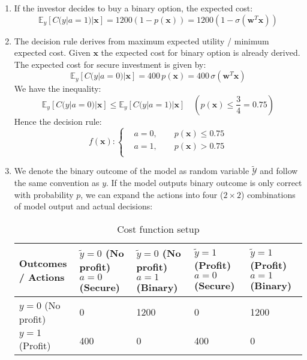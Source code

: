 \documentclass[a4paper, 10pt]{article}
\begin{document}
\begin{enumerate}[label=(\alph*)]
    \item If the investor decides to buy a binary option, the expected cost:
    \begin{equation}
        \mathbb{E}_y[C(y|a=1)|\mathbf{x}] = 1200 \left(1 - p(\mathbf{x})\right) = 1200 \left(1 - \sigma(\mathbf{w}^T \mathbf{x})\right)
    \end{equation}

    \item The decision rule derives from maximum expected utility / minimum expected cost. Given $\mathbf{x}$ the expected cost for binary option is already derived. The expected cost for secure investment is given by:
    \begin{equation}
        \mathbb{E}_y[C(y|a=0)|\mathbf{x}] = 400 \, p(\mathbf{x}) = 400 \, \sigma(\mathbf{w}^T \mathbf{x})
    \end{equation}
    We have the inequality:
    \begin{equation}
        \mathbb{E}_y[C(y|a=0)|\mathbf{x}] \leq \mathbb{E}_y[C(y|a=1)|\mathbf{x}] \quad \left(p(\mathbf{x}) \leq \frac{3}{4} = 0.75\right)
    \end{equation}
    Hence the decision rule:
    \begin{equation}
        f(\mathbf{x}) : \left\{\begin{aligned}
            &a = 0, \qquad p(\mathbf{x}) \leq 0.75 \\ 
            &a = 1, \qquad p(\mathbf{x}) > 0.75 \\ 
        \end{aligned}\right.
    \end{equation}

    \item We denote the binary outcome of the model as random variable $\widetilde{\mathcal{Y}}$ and follow the same convention as $y$. If the model outputs binary outcome is only correct with probability $p$, we can expand the actions into four ($2\times 2$) combinations of model output and actual decisions:
    \begin{table}[ht]
        \centering
        \caption{Cost function setup}
        \begin{tabular}{p{4cm}|p{2.7cm}|p{2.7cm}|p{2.2cm}|p{2.3cm}}
            \toprule
            Outcomes / Actions & $\widetilde{y}=0$ (No profit) $a=0$ (Secure) & $\widetilde{y}=0$ (No profit) $a=1$ (Binary) & $\widetilde{y}=1$ (Profit) $a=0$ (Secure) & $\widetilde{y}=1$ (Profit) $a=1$ (Binary) \\  
            \midrule
            $y=0$ (No profit) & 0 & 1200 & 0 & 1200 \\
            \hline
            $y=1$ (Profit) & 400 & 0 & 400 & 0 \\
            \bottomrule
        \end{tabular}
    \end{table}


\end{enumerate}
\end{document}
